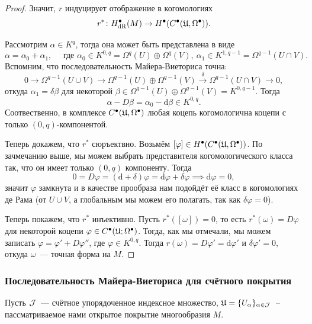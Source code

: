 \begin{proof}
	  	Значит, $r$ индуцирует отображение в когомологиях 
	  	\[
	  		r^* \colon H^{\bullet}_{\dR}(M) \to H^{\bullet}\lr*{C^{\bullet}(\fU, \Omega^{\bullet})}. 
	  	\]

	  	Рассмотрим $\alpha \in K^{q}$, тогда она может быть представлена в виде 
	  	\[
	  		\alpha = \alpha_0 + \alpha_1, \quad \text{ где } \alpha_0 \in K^{0, q} = \Omega^{q}(U) \oplus \Omega^{q}(V), \ \alpha_1 \in K^{1, q - 1} = \Omega^{q - 1}(U \cap V).
	  	\]
	  	Вспомним, что последовательность Майера-Виеториса точна: 
	  	\[
	  		0 \to \Omega^{q - 1}(U \cup V) \to \Omega^{q - 1}(U) \oplus \Omega^{q - 1}(V) \xrightarrow{\delta} \Omega^{q - 1}(U \cap V) \to 0,
	  	\]
	  	откуда $\alpha_1 = \delta \beta$ для некоторой $\beta \in \Omega^{q - 1}(U) \oplus \Omega^{q - 1}(V) = K^{0, q - 1}$. Тогда 
	  	\[
	  		\alpha - D\beta = \alpha_0 - \mathrm{d}\beta \in K^{0, q}.
	  	\]
	  	Соотвественно, в комплексе $C^{\bullet}(\mathfrak{U}, \Omega^{\bullet})$ любая коцепь когомологична коцепи с только $(0, q)$-компонентой. 

	  	Теперь докажем, что $r^*$ сюръектвно. Возьмём $[\varphi] \in H^{\bullet}\lr*{C^{\bullet}(\fU, \Omega^{\bullet})}$. По зачмечанию выше, мы можем выбрать представителя когомологического класса так, что он имеет только $(0, q)$ компоненту. Тогда 
	  	\[
	  		0 = D\varphi = (\mathrm{d} + \delta)\varphi = \mathrm{d}\varphi + \delta \varphi \implies \mathrm{d}\varphi = 0,
	  	\]
	  	значит $\varphi$ замкнута и в качестве прообраза нам подойдёт её класс в когомологиях де Рама (от $U \cup V$, а глобальным мы можем его полагать, так как $\delta \varphi = 0$). 

	  	Теперь покажем, что $r^*$ инъективно. Пусть $r^*([\omega]) = 0$, то есть $r^*(\omega) = D\varphi$ для некоторой коцепи $\varphi \in C^{\bullet}(\mathfrak{U}; \Omega^{\bullet})$. Тогда, как мы отмечали, мы можем записать  $\varphi = \varphi' + D\varphi''$, где $\varphi \in K^{0, q}$.  Тогда $r(\omega) = D\varphi' = \mathrm{d}\varphi'$ и $\delta\varphi' = 0$, откуда $\omega$~--- точная форма на $M$. 


	  \end{proof}

	  \subsubsection{Последовательность Майера-Виеториса для счётного покрытия}

	  Пусть $\mathcal{J}$~--- счётное упорядоченное индексное множество, $\mathfrak{U} = \{ U_{\alpha} \}_{\alpha \in \mathcal{J}}$~-- пассматриваемое нами открытое покрытие многообразия $M$. 


